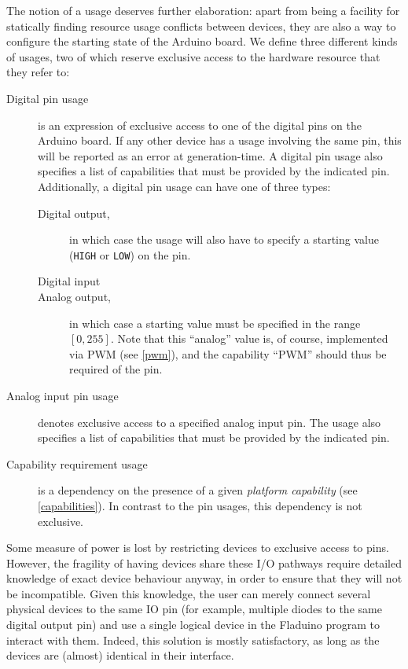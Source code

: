 \documentclass[a4paper, oneside, final]{memoir}
\begin{document}
The notion of a usage deserves further elaboration: apart from being a
facility for statically finding resource usage conflicts between
devices, they are also a way to configure the starting state of the
Arduino board.  We define three different kinds of usages, two of which
reserve exclusive access to the hardware resource that they refer to:

\begin{description}
\item[Digital pin usage] is an expression of exclusive access to one
  of the digital pins on the Arduino board.  If any other device has a
  usage involving the same pin, this will be reported as an error at
  generation-time.  A digital pin usage also specifies a list of
  capabilities that must be provided by the indicated pin.
  Additionally, a digital pin usage can have one of three types:
  \begin{description}
  \item[Digital output,] in which case the usage will also have to
    specify a starting value (\texttt{HIGH} or \texttt{LOW}) on the
    pin.
  \item[Digital input]
  \item[Analog output,] in which case a starting value must be
    specified in the range $[0,255]$.  Note that this ``analog'' value
    is, of course, implemented via PWM (see \ref{pwm}), and the
    capability ``PWM'' should thus be required of the pin.
  \end{description}
\item[Analog input pin usage] denotes exclusive access to a specified
  analog input pin.  The usage also specifies a list of capabilities
  that must be provided by the indicated pin.
\item[Capability requirement usage] is a dependency on the presence of
  a given \textit{platform capability} (see \ref{capabilities}).  In
  contrast to the pin usages, this dependency is not exclusive.
\end{description}

Some measure of power is lost by restricting devices to exclusive
access to pins.  However, the fragility of having devices share these
I/O pathways require detailed knowledge of exact device behaviour
anyway, in order to ensure that they will not be incompatible.  Given
this knowledge, the user can merely connect several physical devices
to the same IO pin (for example, multiple diodes to the same digital
output pin) and use a single logical device in the Fladuino program to
interact with them.  Indeed, this solution is mostly satisfactory, as
long as the devices are (almost) identical in their interface.
\end{document}
